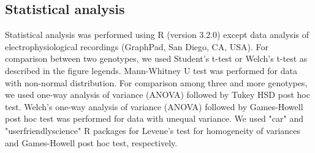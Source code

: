 \subsection*{Statistical analysis}

Statistical analysis was performed using R (version 3.2.0)\cite{R} except data analysis of electrophysiological recordings (GraphPad, San Diego, CA, USA).
For comparison between two genotypes, we used Student's t-test or Welch's t-test as described in the figure legends.
Mann-Whitney U test was performed for data with non-normal distribution.
For comparison among three and more genotypes, we used one-way analysis of variance (ANOVA) followed by Tukey HSD post hoc test. 
Welch's one-way analysis of variance (ANOVA) followed by Games-Howell post hoc test was performed for data with unequal variance.
We used "car"\cite{car} and "userfriendlyscience"\cite{user} R packages for Levene's test for homogeneity of variances and Games-Howell post hoc test, respectively. 
  
  
  
  
  
  
  
  
  
  
  